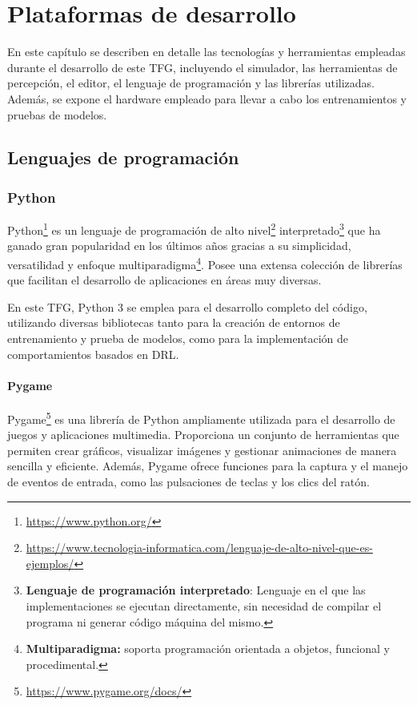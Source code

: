 \chapter{Plataformas de desarrollo}
\label{cap:capitulo3}

En este capítulo se describen en detalle las tecnologías y herramientas empleadas durante el desarrollo de este \ac{TFG}, incluyendo el simulador, las herramientas de percepción, el editor, el lenguaje de programación y las librerías utilizadas. Además, se expone el hardware empleado para llevar a cabo los entrenamientos y pruebas de modelos.

\section{Lenguajes de programación}
\label{sec:programación}
\subsection{Python}
\label{sec:python}

Python\footnote{\url{https://www.python.org/}} es un lenguaje de programación de alto nivel\footnote{\url{https://www.tecnologia-informatica.com/lenguaje-de-alto-nivel-que-es-ejemplos/}} interpretado\footnote{\textbf{Lenguaje de programación interpretado}: Lenguaje en el que las implementaciones se ejecutan directamente, sin necesidad de compilar el programa ni generar código máquina del mismo.} que ha ganado gran popularidad en los últimos años gracias a su simplicidad, versatilidad y enfoque multiparadigma\footnote{\textbf{Multiparadigma:} soporta programación orientada a objetos, funcional y procedimental.}. Posee una extensa colección de librerías que facilitan el desarrollo de aplicaciones en áreas muy diversas.

En este \ac{TFG}, Python 3 se emplea para el desarrollo completo del código, utilizando diversas bibliotecas tanto para la creación de entornos de entrenamiento y prueba de modelos, como para la implementación de comportamientos basados en \ac{DRL}.

\subsubsection{Pygame}
\label{sec:pygame}

Pygame\footnote{\url{https://www.pygame.org/docs/}} es una librería de Python ampliamente utilizada para el desarrollo de juegos y aplicaciones multimedia. Proporciona un conjunto de herramientas que permiten crear gráficos, visualizar imágenes y gestionar animaciones de manera sencilla y eficiente. Además, Pygame ofrece funciones para la captura y el manejo de eventos de entrada, como las pulsaciones de teclas y los clics del ratón.


